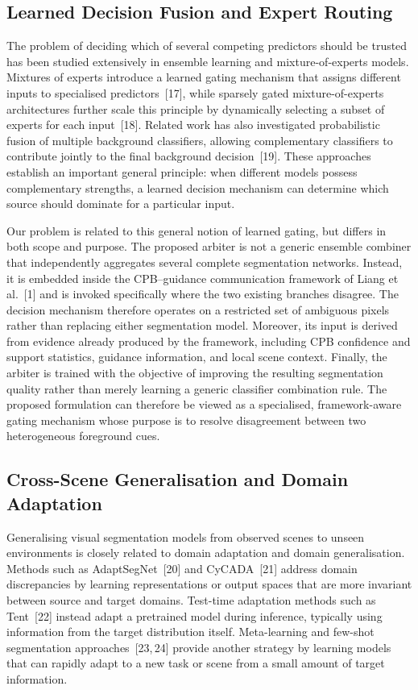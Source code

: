 \documentclass[sn-basic]{sn-jnl}
\begin{document}
\subsection{Learned Decision Fusion and Expert Routing}
The problem of deciding which of several competing predictors should be trusted has
been studied extensively in ensemble learning and mixture-of-experts models.
Mixtures of experts introduce a learned gating mechanism that assigns different
inputs to specialised predictors~[17], while sparsely gated mixture-of-experts
architectures further scale this principle by dynamically selecting a subset of
experts for each input~[18]. Related work has also investigated probabilistic
fusion of multiple background classifiers, allowing complementary classifiers to
contribute jointly to the final background decision~[19]. These approaches establish
an important general principle: when different models possess complementary
strengths, a learned decision mechanism can determine which source should dominate
for a particular input.

Our problem is related to this general notion of learned gating, but differs in both
scope and purpose. The proposed arbiter is not a generic ensemble combiner that
independently aggregates several complete segmentation networks. Instead, it is
embedded inside the CPB--guidance communication framework of Liang et al.~[1] and is
invoked specifically where the two existing branches disagree. The decision
mechanism therefore operates on a restricted set of ambiguous pixels rather than
replacing either segmentation model. Moreover, its input is derived from evidence
already produced by the framework, including CPB confidence and support statistics,
guidance information, and local scene context. Finally, the arbiter is trained with
the objective of improving the resulting segmentation quality rather than merely
learning a generic classifier combination rule. The proposed formulation can
therefore be viewed as a specialised, framework-aware gating mechanism whose purpose
is to resolve disagreement between two heterogeneous foreground cues.

\subsection{Cross-Scene Generalisation and Domain Adaptation}
Generalising visual segmentation models from observed scenes to unseen environments
is closely related to domain adaptation and domain generalisation. Methods such as
AdaptSegNet~[20] and CyCADA~[21] address domain discrepancies by learning
representations or output spaces that are more invariant between source and target
domains. Test-time adaptation methods such as Tent~[22] instead adapt a pretrained
model during inference, typically using information from the target distribution
itself. Meta-learning and few-shot segmentation approaches~[23,\,24] provide another
strategy by learning models that can rapidly adapt to a new task or scene from a
small amount of target information.
\end{document}
